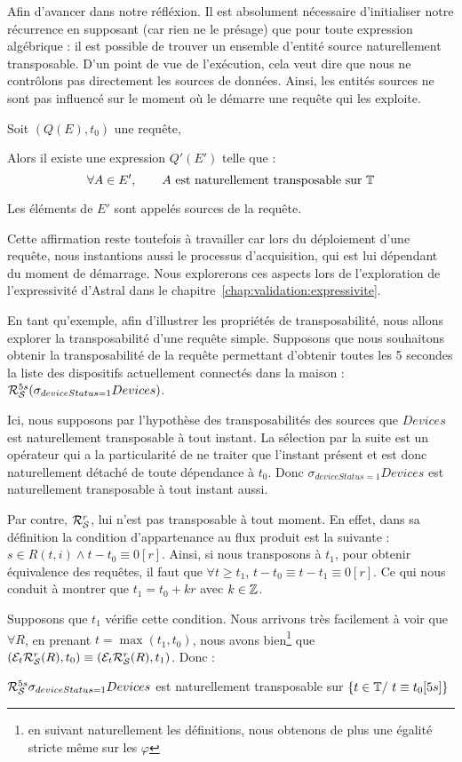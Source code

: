 Afin d'avancer dans notre réfléxion. Il est absolument nécessaire d'initialiser notre récurrence en supposant (car rien ne le présage) que pour toute expression algébrique : il est possible de trouver un ensemble d'entité source naturellement transposable. D'un point de vue de l'exécution, cela veut dire que nous ne contrôlons pas directement les sources de données. Ainsi, les entités sources ne sont pas influencé sur le moment où le démarre une requête qui les exploite.
\begin{hyp}\label{hyp:transposabilite}
    Soit $(Q(E),t_0)$ une requête,

    Alors il existe une expression $Q'(E')$ telle que : $$\forall A\in E', \qquad A \textrm{ est naturellement transposable sur } \mathbb{T}$$
    
    Les éléments de $E'$ sont appelés sources de la requête.
\end{hyp}
Cette affirmation reste toutefois à travailler car lors du déploiement d'une requête, nous instantions aussi le processus d'acquisition, qui est lui dépendant du moment de démarrage. Nous explorerons ces aspects lors de l'exploration de l'expressivité d'Astral dans le chapitre~\ref{chap:validation:expressivite}.

\begin{example}
	En tant qu'exemple, afin d'illustrer les propriétés de transposabilité, nous allons explorer la transposabilité d'une requête simple. Supposons que nous souhaitons obtenir la transposabilité de la requête permettant d'obtenir toutes les 5 secondes la liste des dispositifs actuellement connectés dans la maison : $\mathcal{R}_{\mathcal S}^{5s} (\sigma_{deviceStatus=1} Devices)$. 
	
	Ici, nous supposons par l'hypothèse des transposabilités des sources que $Devices$ est naturellement transposable à tout instant. La sélection par la suite est un opérateur qui a la particularité de ne traiter que l'instant présent et est donc naturellement détaché de toute dépendance à $t_0$. Donc $\sigma_{deviceStatus=1} Devices$ est naturellement transposable à tout instant aussi.
	
	Par contre, $\mathcal{R}_{\mathcal S}^{r}$, lui n'est pas transposable à tout moment. En effet, dans sa définition la condition d'appartenance au flux produit est la suivante : $s \in R(t,i)\wedge t-t_0 \equiv 0[r]$. Ainsi, si nous transposons à $t_1$, pour obtenir équivalence des requêtes, il faut que $\forall t \geq t_1$, $t-t_0\equiv t-t_1\equiv 0[r]$.  Ce qui nous conduit à montrer que $t_1 = t_0 +kr$ avec $k\in \mathbb{Z}$. 
	
	Supposons que $t_1$ vérifie cette condition. Nous arrivons très facilement à voir que $\forall R$, en prenant $t=\max(t_1,t_0)$, nous avons bien\footnote{en suivant naturellement les définitions, nous obtenons de plus une égalité stricte même sur les $\varphi$} que $(\mathcal{E}_{t}\mathcal{R}_{\mathcal S}^{r}(R),t_0) \equiv (\mathcal{E}_{t}\mathcal{R}_{\mathcal S}^{r}(R),t_1)$. Donc :
	\begin{center}$\mathcal{R}_{\mathcal S}^{5s}\sigma_{deviceStatus=1} Devices$ est naturellement transposable sur $\{t\in \mathbb{T} /\ t\equiv t_0 [5s]\}$\end{center}
\end{example}

